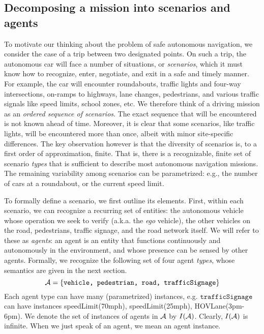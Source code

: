 \subsection{Decomposing a mission into scenarios and agents}
\label{scenarios and agents}
To motivate our thinking about the problem of safe autonomous navigation, we consider the case of a trip between two designated points.
On such a trip, the autonomous car will face a number of situations, or \emph{scenarios}, which it must know how to recognize, enter, negotiate, and exit in a safe and timely manner.
For example, the car will encounter roundabouts, 
traffic lights and four-way intersections, 
on-ramps to highways, 
lane changes, 
pedestrians,  
and various traffic signals like speed limits, school zones, etc.
We therefore think of a driving mission as an \emph{ordered sequence of scenarios}.
The exact sequence that will be encountered is not known ahead of time. 
Moreover, it is clear that some scenarios, like traffic lights, will be encountered more than once, albeit with minor site-specific differences. 
The key observation however is that the diversity of scenarios is, to a first order of approximation, finite. 
That is, there is a recognizable, finite set of scenario \emph{types} that is sufficient to describe most autonomous navigation missions.
The remaining variability among scenarios can be parametrized: e.g., the number of cars at a roundabout, or the current speed limit.

To formally define a scenario, we first outline its elements.
First, within each scenario, we can recognize a recurring set of entities: 
the autonomous vehicle whose operation we seek to verify (a.k.a. the \emph{ego} vehicle), the other vehicles on the road, pedestrians, traffic signage, and the road network itself. 
We will refer to these as \emph{agents}: an agent is an entity that functions continuously and autonomously in the environment, and whose presence can be sensed by other agents. 
Formally, we recognize the following set of four agent \emph{types}, whose semantics are given in the next section.
\[\mathcal{A} = \{\texttt{vehicle, pedestrian, road, trafficSignage}\}\]
Each agent type can have many (parametrized) instances, e.g. $\texttt{trafficSignage}$ can have instances speedLimit(70mph), speedLimit(25mph), HOVLane(3pm-6pm).
We denote the set of instances of agents in $\mathcal{A}$ by $I(\mathcal{A})$.
Clearly, $I(\mathcal{A})$ is infinite.
When we just speak of an agent, we mean an agent instance.

